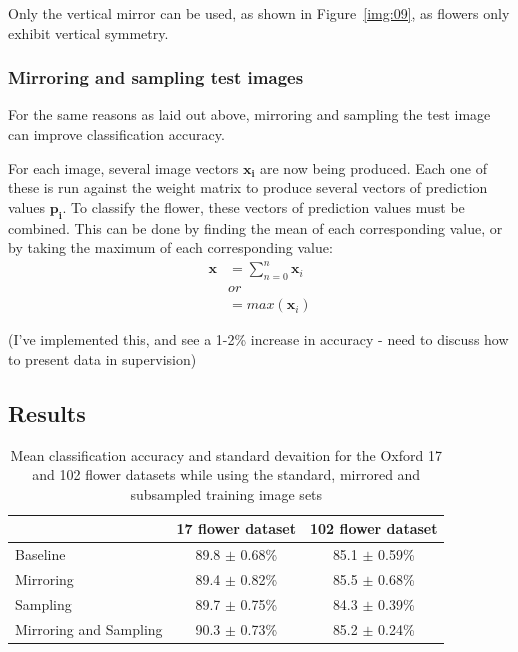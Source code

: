 \documentclass[11pt, a4paper]{report}
\newcommand{\vect}[1]{\boldsymbol{#1}}
\begin{document}
Only the vertical mirror can be used, as shown in Figure~\ref{img:09}, as flowers only exhibit vertical symmetry. 


\subsubsection{Mirroring and sampling test images}

For the same reasons as laid out above, mirroring and sampling the test image can improve classification accuracy.

For each image, several image vectors $\vect{x_{i}}$ are now being produced. Each one of these is run against the weight matrix to produce several vectors of prediction values $\vect{p_{i}}$. To classify the flower, these vectors of prediction values must be combined. This can be done by finding the mean of each corresponding value, or by taking the maximum of each corresponding value:
$$
\begin{aligned}
	\vect{x} &= \sum_{n = 0}^{n} \vect{x}_{i} \\
	& or \\
	&= max(\vect{x}_i)
\end{aligned}
$$

(I've implemented this, and see a 1-2\% increase in accuracy - need to discuss how to present data in supervision)


\subsection{Results}

\begin{table}[h]
\centering 
\renewcommand{\arraystretch}{1.3}
\begin{tabular}{l|cc}
  & {\bf 17 flower dataset} & {\bf 102 flower dataset} \\
  \hline
  Baseline & 89.8 $\pm$ 0.68\% & 85.1 $\pm$ 0.59\% \\
  Mirroring & 89.4 $\pm$ 0.82\% & 85.5 $\pm$ 0.68\% \\
  Sampling & 89.7 $\pm$ 0.75\% & 84.3 $\pm$ 0.39\% \\
  Mirroring and Sampling & 90.3 $\pm$ 0.73\% & 85.2 $\pm$ 0.24\% 
\end{tabular}
\renewcommand{\arraystretch}{1}
\caption{Mean classification accuracy and standard devaition for the Oxford 17 and 102 flower datasets while using the standard, mirrored and subsampled training image sets}
\label{table:accuracy}
\end{table}
\end{document}
